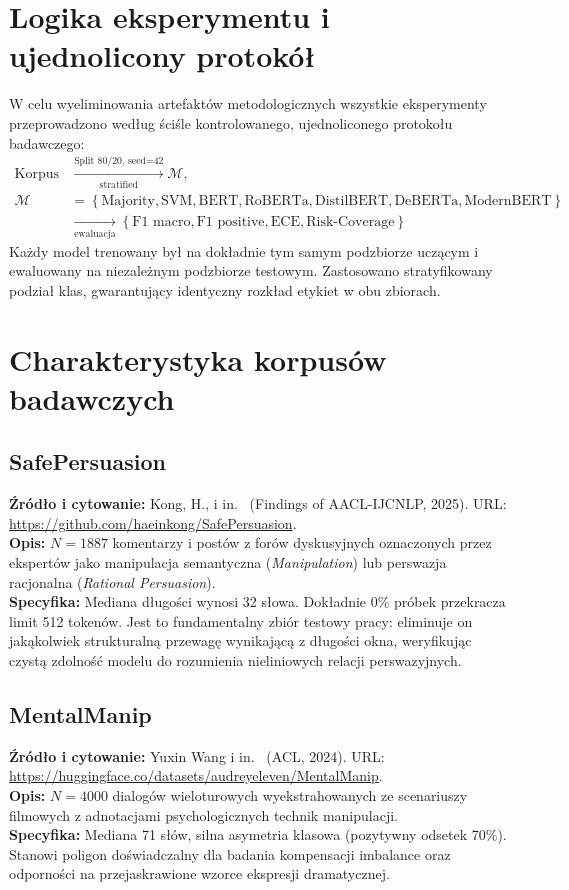 \documentclass[12pt,a4paper,twoside]{report}
\begin{document}
\section{Logika eksperymentu i ujednolicony protokół}
W celu wyeliminowania artefaktów metodologicznych wszystkie eksperymenty przeprowadzono według ściśle kontrolowanego, ujednoliconego protokołu badawczego:
\begin{align}
  \text{Korpus} &\xrightarrow[\text{stratified}]{\text{Split 80/20, seed=42}} \mathcal{M}, \nonumber \\
  \mathcal{M} &= \left\{ \text{Majority}, \text{SVM}, \text{BERT}, \text{RoBERTa}, \text{DistilBERT}, \text{DeBERTa}, \text{ModernBERT} \right\} \nonumber \\
  &\xrightarrow[\text{ewaluacja}]{} \left\{ \text{F1 macro}, \text{F1 positive}, \text{ECE}, \text{Risk-Coverage} \right\}
\end{align}
Każdy model trenowany był na dokładnie tym samym podzbiorze uczącym i ewaluowany na niezależnym podzbiorze testowym. Zastosowano stratyfikowany podział klas, gwarantujący identyczny rozkład etykiet w obu zbiorach.

\section{Charakterystyka korpusów badawczych}\label{sec:datasets}

\subsection{SafePersuasion}
\textbf{Źródło i cytowanie:} Kong, H., i in.~\cite{safepersuasion2025} (Findings of AACL-IJCNLP, 2025). URL: \url{https://github.com/haeinkong/SafePersuasion}.\\
\textbf{Opis:} $N = 1887$ komentarzy i postów z forów dyskusyjnych oznaczonych przez ekspertów jako manipulacja semantyczna (\emph{Manipulation}) lub perswazja racjonalna (\emph{Rational Persuasion}).\\
\textbf{Specyfika:} Mediana długości wynosi 32 słowa. Dokładnie 0\% próbek przekracza limit 512 tokenów. Jest to fundamentalny zbiór testowy pracy: eliminuje on jakąkolwiek strukturalną przewagę wynikającą z długości okna, weryfikując czystą zdolność modelu do rozumienia nieliniowych relacji perswazyjnych.

\subsection{MentalManip}
\textbf{Źródło i cytowanie:} Yuxin Wang i in.~\cite{mentalmanip2024} (ACL, 2024). URL: \url{https://huggingface.co/datasets/audreyeleven/MentalManip}.\\
\textbf{Opis:} $N = 4000$ dialogów wieloturowych wyekstrahowanych ze scenariuszy filmowych z adnotacjami psychologicznych technik manipulacji.\\
\textbf{Specyfika:} Mediana 71 słów, silna asymetria klasowa (pozytywny odsetek 70\%). Stanowi poligon doświadczalny dla badania kompensacji imbalance oraz odporności na przejaskrawione wzorce ekspresji dramatycznej.
\end{document}
